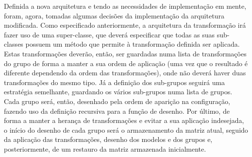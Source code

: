 Definida a nova arquitetura e tendo as necessidades de
implementação em mente, foram, agora, tomadas algumas
decisões da implementação da arquitetura modificada.
\newline
\break
\noindent
Como especificado anteriormente, a arquitetura da 
transformação irá fazer uso de uma super-classe, que
deverá especificar que todas as suas sub-classes possuem
um método que permite à transformação definida ser
aplicada.
\newline
\break
\noindent
Estas transformações deverão, então, ser guardadas numa
lista de transformações do grupo de forma a manter a sua
ordem de aplicação (uma vez que o resultado é diferente
dependendo da ordem das transformações), onde não deverá
haver duas transformações do mesmo tipo.
\newline
\break
\noindent
Já a definição dos sub-grupos seguirá uma estratégia
semelhante, guardando os vários sub-grupos numa lista
de grupos. Cada grupo será, então, desenhado pela ordem
de aparição na configuração, fazendo uso da definição
recursiva para a função de desenho.
\newline
\break
\noindent
Por último, de forma a manter a herança de
transformações e evitar a sua aplicação indesejada,
o início do desenho de cada grupo será
o armazenamento da matriz atual, seguido da aplicação
das transformações, desenho dos modelos e dos grupos e,
posteriormente, de um restauro da matriz armazenada
inicialmente.